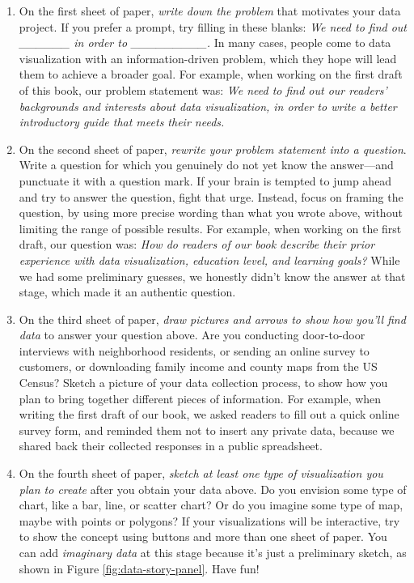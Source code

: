 \documentclass[
  english,
]{book}
\begin{document}
\begin{enumerate}
\def\labelenumi{\arabic{enumi}.}
\item
  On the first sheet of paper, \emph{write down the problem} that motivates your data project. If you prefer a prompt, try filling in these blanks: \emph{We need to find out \_\_\_\_\_\_ in order to \_\_\_\_\_\_\_\_\_.} In many cases, people come to data visualization with an information-driven problem, which they hope will lead them to achieve a broader goal. For example, when working on the first draft of this book, our problem statement was: \emph{We need to find out our readers' backgrounds and interests about data visualization, in order to write a better introductory guide that meets their needs.}
\item
  On the second sheet of paper, \emph{rewrite your problem statement into a question}. Write a question for which you genuinely do not yet know the answer---and punctuate it with a question mark. If your brain is tempted to jump ahead and try to answer the question, fight that urge. Instead, focus on framing the question, by using more precise wording than what you wrote above, without limiting the range of possible results. For example, when working on the first draft, our question was: \emph{How do readers of our book describe their prior experience with data visualization, education level, and learning goals?} While we had some preliminary guesses, we honestly didn't know the answer at that stage, which made it an authentic question.
\item
  On the third sheet of paper, \emph{draw pictures and arrows to show how you'll find data} to answer your question above. Are you conducting door-to-door interviews with neighborhood residents, or sending an online survey to customers, or downloading family income and county maps from the US Census? Sketch a picture of your data collection process, to show how you plan to bring together different pieces of information. For example, when writing the first draft of our book, we asked readers to fill out a quick online survey form, and reminded them not to insert any private data, because we shared back their collected responses in a public spreadsheet.
\item
  On the fourth sheet of paper, \emph{sketch at least one type of visualization you plan to create} after you obtain your data above. Do you envision some type of chart, like a bar, line, or scatter chart? Or do you imagine some type of map, maybe with points or polygons? If your visualizations will be interactive, try to show the concept using buttons and more than one sheet of paper. You can add \emph{imaginary data} at this stage because it's just a preliminary sketch, as shown in Figure \ref{fig:data-story-panel}. Have fun!
\end{enumerate}
\end{document}
